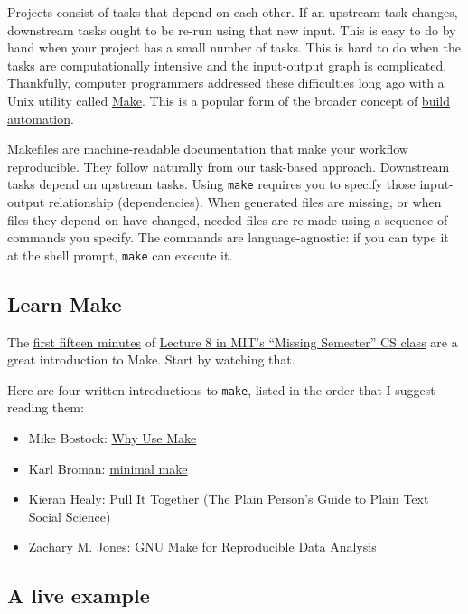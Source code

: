 Projects consist of tasks that depend on each other.
If an upstream task changes, downstream tasks ought to be re-run using that new input.
This is easy to do by hand when your project has a small number of tasks.
This is hard to do when the tasks are computationally intensive and the input-output graph is complicated.
Thankfully, computer programmers addressed these difficulties long ago with a Unix utility called \href{https://en.wikipedia.org/wiki/Make_(software)}{Make}.
This is a popular form of the broader concept of \href{https://tradediversion.net/2019/11/06/why-your-research-project-needs-build-automation/}{build automation}.

Makefiles are machine-readable documentation that make your workflow reproducible.
They follow naturally from our task-based approach.
Downstream tasks depend on upstream tasks.
Using \texttt{make} requires you to specify those input-output relationship (dependencies).
When generated files are missing, or when files they depend on have changed, needed files are re-made using a sequence of commands you specify.
The commands are language-agnostic: if you can type it at the shell prompt,
\texttt{make} can execute it.

\subsection{Learn Make}

The \href{https://www.youtube.com/watch?v=_Ms1Z4xfqv4}{first fifteen minutes} of
\href{https://missing.csail.mit.edu/2020/metaprogramming/}{Lecture 8 in MIT's ``Missing Semester'' CS class}
are a great introduction to Make.
Start by watching that.

Here are four written introductions to \texttt{make}, listed in the order that I suggest reading them:
\begin{itemize}
\item Mike Bostock: \href{https://bost.ocks.org/mike/make/}{Why Use Make}
\item Karl Broman: \href{http://kbroman.org/minimal_make/}{minimal make}
\item Kieran Healy: \href{http://plain-text.co/pull-it-together.html}{Pull It Together} (The Plain Person's Guide to Plain Text Social Science)
\item Zachary M. Jones: \href{http://zmjones.com/make/}{GNU Make for Reproducible Data Analysis}
\end{itemize}

\subsection{A live example}

